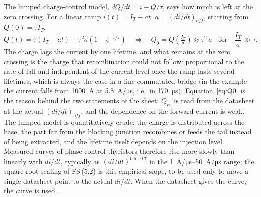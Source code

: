 \documentclass[10pt,a4paper]{scrartcl}
\newcommand{\fs}[1]{\textsf{FS}\,(#1)}
\begin{document}
The lumped charge-control model, $dQ/dt = i - Q/\tau$, says how much is left at the zero crossing. For a linear ramp $i(t) = I_T - at$, $a = (di/dt)_{off}$, starting from $Q(0) = \tau I_T$,
\begin{equation}
Q(t) = \tau(I_T - at) + \tau^2a\left(1-e^{-t/\tau}\right)
\quad\Rightarrow\quad
Q_0 = Q\!\left(\tfrac{I_T}{a}\right) \approx \tau^2\,a \quad\text{for}\quad \frac{I_T}{a}\gg\tau .
\label{eq:Q0}
\end{equation}
The charge lags the current by one lifetime, and what remains at the zero crossing is the charge that recombination could not follow: proportional to the rate of fall and independent of the current level once the ramp lasts several lifetimes, which is always the case in a line-commutated bridge (in the example the current falls from \SI{1000}{A} at \SI{5.8}{A/\micro s}, i.e.\ in \SI{170}{\micro s}). Equation~\eqref{eq:Q0} is the reason behind the two statements of the sheet: $Q_{rr}$ is read from the datasheet at the actual $(di/dt)_{off}$, and the dependence on the forward current is weak. The lumped model is quantitatively crude: the charge is distributed across the base, the part far from the blocking junction recombines or feeds the tail instead of being extracted, and the lifetime itself depends on the injection level. Measured curves of phase-control thyristors therefore rise more slowly than linearly with $di/dt$, typically as $(di/dt)^{0.5\ldots0.7}$ in the \SIrange{1}{50}{A/\micro s} range; the square-root scaling of \fs{5.2} is this empirical slope, to be used only to move a single datasheet point to the actual $di/dt$. When the datasheet gives the curve, the curve is used.
\end{document}

